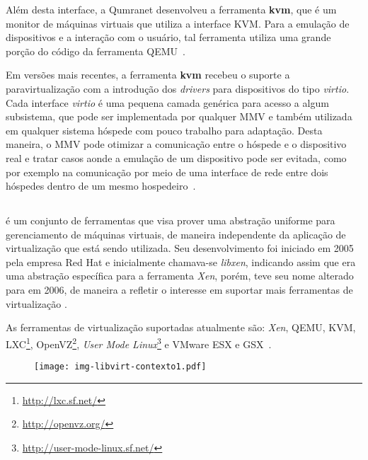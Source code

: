 Além desta interface, a Qumranet desenvolveu a ferramenta \textbf{kvm},
que é um monitor de máquinas virtuais que utiliza a interface KVM. Para a
emulação de dispositivos e a interação com o usuário, tal ferramenta utiliza uma grande
porção do código da ferramenta QEMU~\cite{kerneltrap2007avi}.

Em versões mais recentes, a ferramenta \textbf{kvm} recebeu o suporte a
paravirtualização com a introdução dos \emph{drivers} para dispositivos do tipo
\emph{virtio}. Cada interface \emph{virtio} é uma pequena camada genérica para
acesso a algum subsistema, que pode ser implementada por qualquer MMV e também
utilizada em qualquer sistema hóspede com pouco trabalho para adaptação. Desta
maneira, o MMV pode otimizar a comunicação entre o hóspede e o dispositivo real
e tratar casos aonde a emulação de um dispositivo pode ser evitada, como
por exemplo na comunicação por meio de uma interface de rede entre dois
hóspedes dentro de um mesmo hospedeiro~\cite{russell2008virtio}.


\subsection{\libvirt}\label{sec:libvirt}


\libvirt{} é um conjunto de ferramentas que visa prover uma abstração
uniforme para gerenciamento de máquinas virtuais, de maneira independente 
da aplicação de virtualização que está sendo utilizada. Seu desenvolvimento
foi iniciado em 2005 pela empresa Red Hat e inicialmente chamava-se
\emph{libxen}, indicando assim que era uma abstração específica para a
ferramenta \emph{Xen}, porém, teve seu nome alterado para \libvirt{} em
2006, de maneira a refletir o interesse em suportar mais ferramentas de
virtualização .

As ferramentas de virtualização suportadas atualmente são: \emph{Xen}, QEMU,
KVM, LXC\footnote{\url{http://lxc.sf.net/}},
OpenVZ\footnote{\url{http://openvz.org/}}, \emph{User Mode
Linux}\footnote{\url{http://user-mode-linux.sf.net/}} e VMware ESX e GSX~\cite{libvirtindex}.

\begin{figure}[htp]
\centering
\texttt{[image: img-libvirt-contexto1.pdf]}
\label{fig:libvirtcontexto1}
\end{figure}

